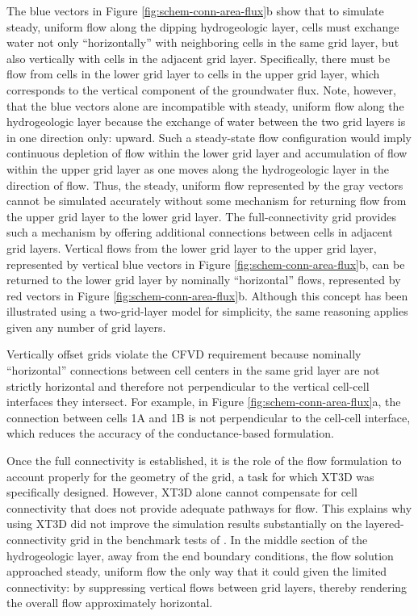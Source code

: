 \documentclass{article}
\begin{document}
The blue vectors in Figure \ref{fig:schem-conn-area-flux}b show that to simulate steady, uniform flow along the dipping hydrogeologic layer, cells must exchange water not only ``horizontally'' with neighboring cells in the same grid layer, but also vertically with cells in the adjacent grid layer. Specifically, there must be flow from cells in the lower grid layer to cells in the upper grid layer, which corresponds to the vertical component of the groundwater flux. Note, however, that the blue vectors alone are incompatible with steady, uniform flow along the hydrogeologic layer because the exchange of water between the two grid layers is in one direction only: upward. Such a steady-state flow configuration would imply continuous depletion of flow within the lower grid layer and accumulation of flow within the upper grid layer as one moves along the hydrogeologic layer in the direction of flow. Thus, the steady, uniform flow represented by the gray vectors cannot be simulated accurately without some mechanism for returning flow from the upper grid layer to the lower grid layer. The full-connectivity grid provides such a mechanism by offering additional connections between cells in adjacent grid layers. Vertical flows from the lower grid layer to the upper grid layer, represented by vertical blue vectors in Figure \ref{fig:schem-conn-area-flux}b, can be returned to the lower grid layer by nominally ``horizontal'' flows, represented by red vectors in Figure \ref{fig:schem-conn-area-flux}b. Although this concept has been illustrated using a two-grid-layer model for simplicity, the same reasoning applies given any number of grid layers.

Vertically offset grids violate the CFVD requirement because nominally ``horizontal'' connections between cell centers in the same grid layer are not strictly horizontal and therefore not perpendicular to the vertical cell-cell interfaces they intersect. For example, in Figure \ref{fig:schem-conn-area-flux}a, the connection between cells 1A and 1B is not perpendicular to the cell-cell interface, which reduces the accuracy of the conductance-based formulation.

Once the full connectivity is established, it is the role of the flow formulation to account properly for the geometry of the grid, a task for which XT3D was specifically designed. However, XT3D alone cannot compensate for cell connectivity that does not provide adequate pathways for flow. This explains why using XT3D did not improve the simulation results substantially on the layered-connectivity grid in the benchmark tests of \cite{bardot2023}.  In the middle section of the hydrogeologic layer, away from the end boundary conditions, the flow solution approached steady, uniform flow the only way that it could given the limited connectivity: by suppressing vertical flows between grid layers, thereby rendering the overall flow approximately horizontal.
\end{document}
